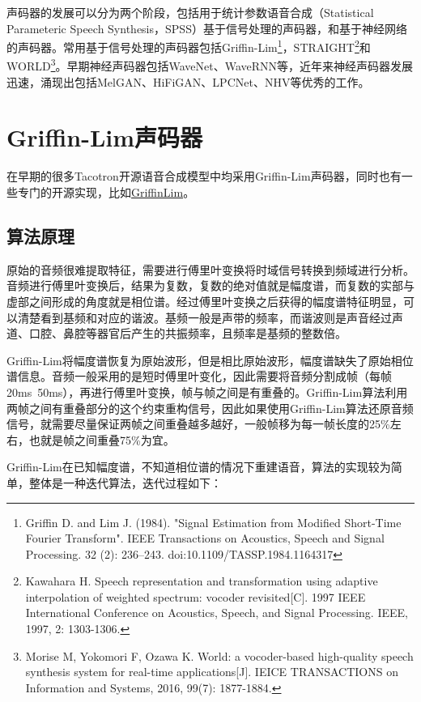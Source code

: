 \documentclass[cn,10pt,math=newtx,citestyle=gb7714-2015,bibstyle=gb7714-2015]{elegantbook}
\begin{document}
声码器的发展可以分为两个阶段，包括用于统计参数语音合成（Statistical Parameteric Speech Synthesis，SPSS）基于信号处理的声码器，和基于神经网络的声码器。常用基于信号处理的声码器包括Griffin-Lim\footnote{Griffin D. and Lim J. (1984). "Signal Estimation from Modified Short-Time Fourier Transform". IEEE Transactions on Acoustics, Speech and Signal Processing. 32 (2): 236–243. doi:10.1109/TASSP.1984.1164317}，STRAIGHT\footnote{Kawahara H. Speech representation and transformation using adaptive interpolation of weighted spectrum: vocoder revisited[C]. 1997 IEEE International Conference on Acoustics, Speech, and Signal Processing. IEEE, 1997, 2: 1303-1306.}和WORLD\footnote{Morise M, Yokomori F, Ozawa K. World: a vocoder-based high-quality speech synthesis system for real-time applications[J]. IEICE TRANSACTIONS on Information and Systems, 2016, 99(7): 1877-1884.}。早期神经声码器包括WaveNet、WaveRNN等，近年来神经声码器发展迅速，涌现出包括MelGAN、HiFiGAN、LPCNet、NHV等优秀的工作。

\section{Griffin-Lim声码器}

在早期的很多Tacotron开源语音合成模型中均采用Griffin-Lim声码器，同时也有一些专门的开源实现，比如\href{https://github.com/bkvogel/griffin_lim}{GriffinLim}。

\subsection{算法原理}

原始的音频很难提取特征，需要进行傅里叶变换将时域信号转换到频域进行分析。音频进行傅里叶变换后，结果为复数，复数的绝对值就是幅度谱，而复数的实部与虚部之间形成的角度就是相位谱。经过傅里叶变换之后获得的幅度谱特征明显，可以清楚看到基频和对应的谐波。基频一般是声带的频率，而谐波则是声音经过声道、口腔、鼻腔等器官后产生的共振频率，且频率是基频的整数倍。

Griffin-Lim将幅度谱恢复为原始波形，但是相比原始波形，幅度谱缺失了原始相位谱信息。音频一般采用的是短时傅里叶变化，因此需要将音频分割成帧（每帧20ms~50ms），再进行傅里叶变换，帧与帧之间是有重叠的。Griffin-Lim算法利用两帧之间有重叠部分的这个约束重构信号，因此如果使用Griffin-Lim算法还原音频信号，就需要尽量保证两帧之间重叠越多越好，一般帧移为每一帧长度的25\%左右，也就是帧之间重叠75\%为宜。

Griffin-Lim在已知幅度谱，不知道相位谱的情况下重建语音，算法的实现较为简单，整体是一种迭代算法，迭代过程如下：
\end{document}
